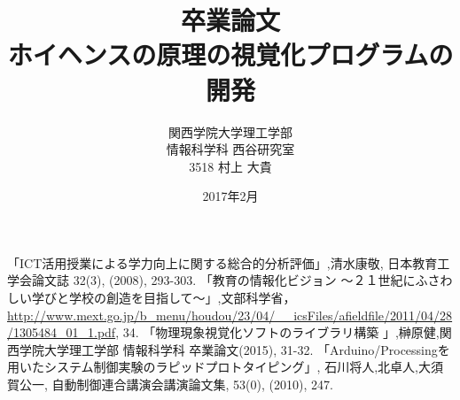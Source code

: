 \documentclass[12pt,a4]{jreport}%
\title{卒業論文\\ホイヘンスの原理の視覚化プログラムの開発}
\author{関西学院大学理工学部\\情報科学科 西谷研究室\\3518 村上 大貴}
\date{2017年2月}
\begin{document}
\maketitle
\newpage



\tableofcontents





\begin{thebibliography}{9}
「ICT活用授業による学力向上に関する総合的分析評価」,清水康敬, 日本教育工学会論文誌 32(3), (2008), 293-303.
「教育の情報化ビジョン 〜２１世紀にふさわしい学びと学校の創造を目指して〜」,文部科学省，\url{http://www.mext.go.jp/b_menu/houdou/23/04/__icsFiles/afieldfile/2011/04/28/1305484_01_1.pdf}, 34.
「物理現象視覚化ソフトのライブラリ構築 」,榊原健,関西学院大学理工学部 情報科学科 卒業論文(2015), 31-32.
 「Arduino/Processingを用いたシステム制御実験のラピッドプロトタイピング」, 石川将人,北卓人,大須賀公一, 自動制御連合講演会講演論文集, 53(0), (2010), 247.
\end{thebibliography}
\end{document}
